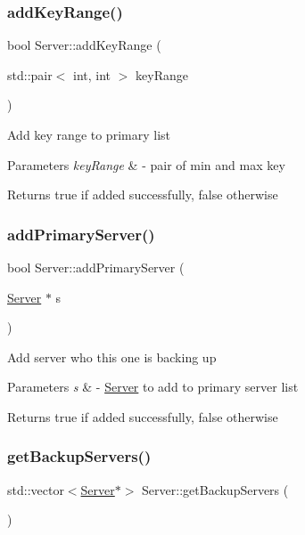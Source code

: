 \subsubsection{\texorpdfstring{add\+Key\+Range()}{addKeyRange()}}
{\footnotesize\ttfamily bool Server\+::add\+Key\+Range (\begin{DoxyParamCaption}\item[{std\+::pair$<$ int, int $>$}]{key\+Range }\end{DoxyParamCaption})}

Add key range to primary list


\begin{DoxyParams}{Parameters}
{\em key\+Range} & -\/ pair of min and max key\\
\hline
\end{DoxyParams}
\begin{DoxyReturn}{Returns}
true if added successfully, false otherwise 
\end{DoxyReturn}
\mbox{\label{classServer_a2f865f52beecb3be03eda85b4dc64e3e}} 
\subsubsection{\texorpdfstring{add\+Primary\+Server()}{addPrimaryServer()}}
{\footnotesize\ttfamily bool Server\+::add\+Primary\+Server (\begin{DoxyParamCaption}\item[{\mbox{\hyperlink{classServer}{Server}} $\ast$}]{s }\end{DoxyParamCaption})}

Add server who this one is backing up


\begin{DoxyParams}{Parameters}
{\em s} & -\/ \mbox{\hyperlink{classServer}{Server}} to add to primary server list\\
\hline
\end{DoxyParams}
\begin{DoxyReturn}{Returns}
true if added successfully, false otherwise 
\end{DoxyReturn}
\mbox{\label{classServer_a71a34c248da1cb74f3453f06223a606e}} 
\subsubsection{\texorpdfstring{get\+Backup\+Servers()}{getBackupServers()}}
{\footnotesize\ttfamily std\+::vector$<$\mbox{\hyperlink{classServer}{Server}}$\ast$$>$ Server\+::get\+Backup\+Servers (\begin{DoxyParamCaption}{ }\end{DoxyParamCaption})\hspace{0.3cm}{\ttfamily [inline]}}

